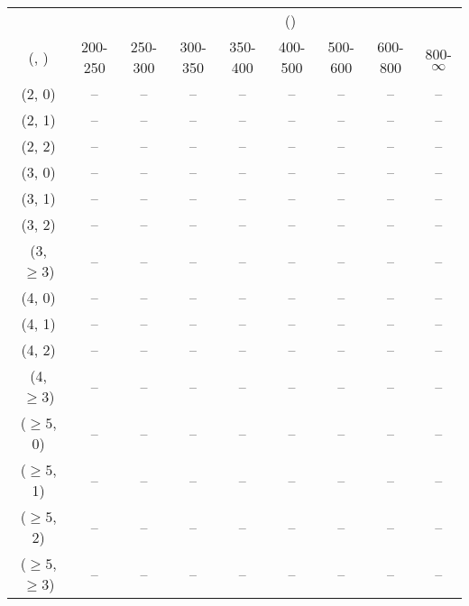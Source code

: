 \begin{table}[h!]
\tiny
\centering
{}
\begin{tabular}
{ccccccccc}
	\hline\hline
&	& \multicolumn{8}{c}{\scalht (\gev)} \\ 
	 (\njet,  \nb) & 200-250 & 250-300 & 300-350 & 350-400 & 400-500 & 500-600 & 600-800 & 800-$\infty$ \\ [0.8ex] 
\hline
	(2, 0) & -- & -- & -- & -- & -- & -- & -- & -- \\[0.5ex] 
	(2, 1) & -- & -- & -- & -- & -- & -- & -- & -- \\[0.5ex] 
	(2, 2) & -- & -- & -- & -- & -- & -- & -- & -- \\[0.5ex] 
	(3, 0) & -- & -- & -- & -- & -- & -- & -- & -- \\[0.5ex] 
	(3, 1) & -- & -- & -- & -- & -- & -- & -- & -- \\[0.5ex] 
	(3, 2) & -- & -- & -- & -- & -- & -- & -- & -- \\[0.5ex] 
	(3, $\ge3$) & -- & -- & -- & -- & -- & -- & -- & -- \\[0.5ex] 
	(4, 0) & -- & -- & -- & -- & -- & -- & -- & -- \\[0.5ex] 
	(4, 1) & -- & -- & -- & -- & -- & -- & -- & -- \\[0.5ex] 
	(4, 2) & -- & -- & -- & -- & -- & -- & -- & -- \\[0.5ex] 
	(4, $\ge3$) & -- & -- & -- & -- & -- & -- & -- & -- \\[0.5ex] 
	($\ge5$, 0) & -- & -- & -- & -- & -- & -- & -- & -- \\[0.5ex] 
	($\ge5$, 1) & -- & -- & -- & -- & -- & -- & -- & -- \\[0.5ex] 
	($\ge5$, 2) & -- & -- & -- & -- & -- & -- & -- & -- \\[0.5ex] 
	($\ge5$, $\ge3$) & -- & -- & -- & -- & -- & -- & -- & -- \\[0.5ex] 
	\hline
	\hline
\end{tabular}
\end{table}
